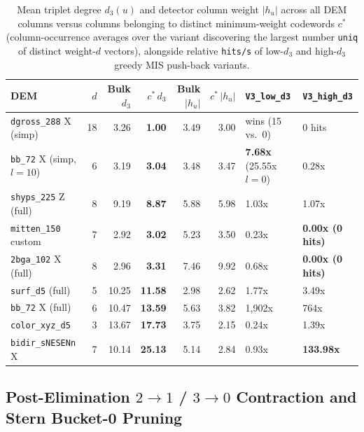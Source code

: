 \documentclass[12pt]{article}
\theoremstyle{definition}
\newcommand{\ttt}[1]{\texttt{#1}}
\begin{document}
\begin{table}[htbp]
\centering
\caption{Mean triplet degree $d_3(u)$ and detector column weight $|h_u|$ across all DEM columns versus columns
belonging to distinct minimum-weight codewords $c^*$ (column-occurrence averages over the variant discovering the
largest number \ttt{uniq} of distinct weight-$d$ vectors), alongside relative \ttt{hits/s} of low-$d_3$ and
high-$d_3$ greedy MIS push-back variants.}\label{tab:d3_bias}
\smallskip
\footnotesize
\setlength{\tabcolsep}{4.0pt}
\begin{tabular}{@{}lrrrrrll@{}}
\toprule
DEM & $d$ & Bulk $d_3$ & $c^*\,d_3$ & Bulk $|h_u|$ & $c^*\,|h_u|$ & \ttt{V3\_low\_d3} & \ttt{V3\_high\_d3} \\
\midrule
\ttt{dgross\_288} X (simp) & 18 & 3.26 & \textbf{1.00} & 3.49 & 3.00 & wins (15 vs.\ 0) & 0 hits \\
\ttt{bb\_72} X (simp, $l=10$) & 6 & 3.19 & \textbf{3.04} & 3.48 & 3.47 & \textbf{7.68x} (25.55x $l{=}0$) & 0.28x \\
\ttt{shyps\_225} Z (full) & 8 & 9.19 & \textbf{8.87} & 5.88 & 5.98 & 1.03x & 1.07x \\
\ttt{mitten\_150} custom & 7 & 2.92 & \textbf{3.02} & 5.23 & 3.50 & 0.23x & \textbf{0.00x (0 hits)} \\
\ttt{2bga\_102} X (full) & 8 & 2.96 & \textbf{3.31} & 7.46 & 9.92 & 0.68x & \textbf{0.00x (0 hits)} \\
\ttt{surf\_d5} (full) & 5 & 10.25 & \textbf{11.58} & 2.98 & 2.62 & 1.77x & 3.49x \\
\ttt{bb\_72} X (full) & 6 & 10.47 & \textbf{13.59} & 5.63 & 3.82 & 1,902x & 764x \\
\ttt{color\_xyz\_d5} & 3 & 13.67 & \textbf{17.73} & 3.75 & 2.15 & 0.24x & 1.39x \\
\ttt{bidir\_sNESENn} X & 7 & 10.14 & \textbf{25.13} & 5.14 & 2.84 & 0.93x & \textbf{133.98x} \\
\bottomrule
\end{tabular}
\end{table}

\subsection{Post-Elimination \texorpdfstring{$2 \to 1$ / $3 \to 0$}{2->1 / 3->0} Contraction and Stern Bucket-0
  Pruning}\label{subsec:contraction}
\end{document}
